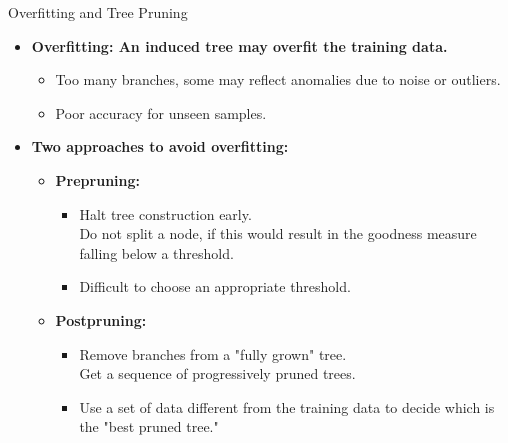 \begin{frame}{Overfitting and Tree Pruning}
  \begin{itemize}
  \item \textbf{Overfitting: An induced tree may overfit the training data.}
    \begin{itemize}
    \item Too many branches, some may reflect anomalies due to noise or outliers.
    \item Poor accuracy for unseen samples.
    \end{itemize}
  \item \textbf{Two approaches to avoid overfitting:}
    \begin{itemize}
    \item \textbf{\color{airforceblue}Prepruning:}
      \begin{itemize}
      \item Halt tree construction early.\\
        Do not split a node, if this would result in the goodness measure falling below a threshold.
      \item Difficult to choose an appropriate threshold.
      \end{itemize}
    \item \textbf{\color{airforceblue}Postpruning:}
      \begin{itemize}
      \item Remove branches from a "fully grown" tree.\\
        Get a sequence of progressively pruned trees.
      \item Use a set of data different from the training data to decide which is the "best pruned tree."
      \end{itemize}
    \end{itemize}
  \end{itemize}
\end{frame}


